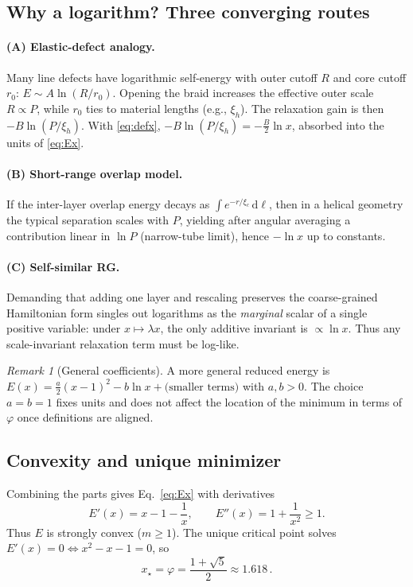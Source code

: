 \documentclass[11pt]{article}
\theoremstyle{remark}
\newtheorem{remark}{Remark}
\theoremstyle{definition}
\newcommand{\ph}{\varphi}
\begin{document}
\subsection{Why a logarithm? Three converging routes}
\paragraph{(A) Elastic-defect analogy.} Many line defects have logarithmic self-energy with outer cutoff $R$ and core cutoff $r_0$: $E\sim A\ln(R/r_0)$. Opening the braid increases the effective outer scale $R\propto P$, while $r_0$ ties to material lengths (e.g., $\xi_h$). The relaxation gain is then $-B\ln(P/\xi_h)$. With \eqref{eq:defx}, $-B\ln(P/\xi_h)=-\tfrac{B}{2}\ln x$, absorbed into the units of \eqref{eq:Ex}.

\paragraph{(B) Short-range overlap model.} If the inter-layer overlap energy decays as $\int e^{-r/\xi_c}\,\mathrm d\ell$, then in a helical geometry the typical separation scales with $P$, yielding after angular averaging a contribution linear in $\ln P$ (narrow-tube limit), hence $-\ln x$ up to constants.

\paragraph{(C) Self-similar RG.} Demanding that adding one layer and rescaling preserves the coarse-grained Hamiltonian form singles out logarithms as the \emph{marginal} scalar of a single positive variable: under $x\mapsto \lambda x$, the only additive invariant is $\propto \ln x$. Thus any scale-invariant relaxation term must be log-like.

\begin{remark}[General coefficients]
A more general reduced energy is $E(x)=\tfrac{a}{2}(x-1)^2-b\ln x+\text{(smaller terms)}$ with $a,b>0$. The choice $a=b=1$ fixes units and does not affect the location of the minimum in terms of $\ph$ once definitions are aligned.
\end{remark}

\subsection{Convexity and unique minimizer}
Combining the parts gives Eq.~\eqref{eq:Ex} with derivatives
\begin{equation}
 E'(x)=x-1-\frac{1}{x},\qquad E''(x)=1+\frac{1}{x^2}\ge1.
\end{equation}
Thus $E$ is strongly convex ($m\ge1$). The unique critical point solves $E'(x)=0\iff x^2-x-1=0$, so
\begin{equation}
 x_\star=\ph=\frac{1+\sqrt5}{2} \approx 1.618\,.
\end{equation}
\end{document}
